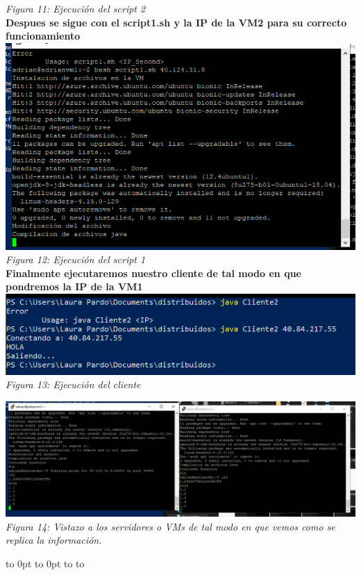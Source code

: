 \documentclass[10pt,executivepaper]{article}
\def\fillandplacepagenumber{%
 \par\pagestyle{empty}%
 \vbox to 0pt{\vss}\vfill
 \vbox to 0pt{\baselineskip0pt
   \hbox to\linewidth{\hss}%
   \baselineskip\footskip
   \hbox to\linewidth{%
     \hfil\thepage\hfil}\vss}}
\begin{document}
\begin{center}
  \textit{Figura 11: Ejecución del script 2 }\\
  \textbf{Despues se sigue con el script1.sh y la IP de la VM2 para su correcto funcionamiento}
  \includegraphics[scale=0.65]{imgs/vm1_ex.png}\\
  \textit{Figura 12: Ejecución del script 1}\\
  \textbf{Finalmente ejecutaremos nuestro cliente de tal modo en que pondremos la IP de la VM1}\\
  \includegraphics[scale=0.75]{imgs/ex_cliente.png}\\
  \textit{Figura 13: Ejecución del cliente}\\
  \begin{landscape}
    \includegraphics[scale=0.65]{imgs/ex_vms.png}\\
    \textit{Figura 14: Vistazo a los servidores o VMs de tal modo en que vemos como se replica la información.}
    \fillandplacepagenumber
  \end{landscape}
\end{center}
\end{document}

